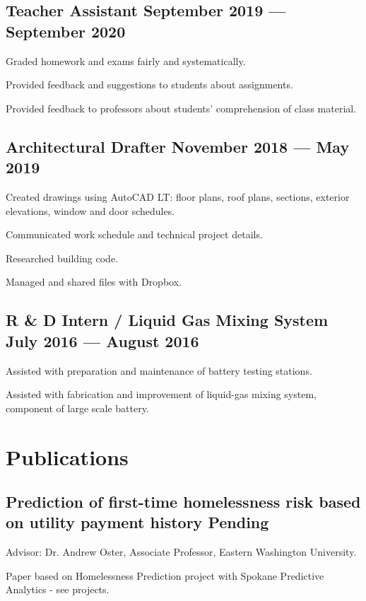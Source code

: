 \documentclass[letter,10pt]{article}
\begin{document}
\subsection{{Teacher Assistant \hfill September 2019 --- September 2020}}
\begin{zitemize}
    \item Graded homework and exams fairly and systematically.
    \item Provided feedback and suggestions to students about assignments.
    \item Provided feedback to professors about students' comprehension of class material.
\end{zitemize}

\subsection{{Architectural Drafter \hfill November 2018 --- May 2019}}
\begin{zitemize}
    \item Created drawings using AutoCAD LT: floor plans, roof plans, sections, exterior elevations, window and door schedules.
    \item Communicated work schedule and technical project details.
    \item Researched building code.
    \item Managed and shared files with Dropbox.
\end{zitemize}

\subsection{{R \& D Intern / Liquid Gas Mixing System \hfill July 2016 --- August 2016}}
\begin{zitemize}
    \item Assisted with preparation and maintenance of battery testing stations.
    \item Assisted with fabrication and improvement of liquid-gas mixing system, component of large scale battery.
\end{zitemize}


\section{Publications}
\subsection{Prediction of first-time homelessness risk based on utility
payment history \hfill Pending}
\begin{zitemize}
    \item Advisor: Dr. Andrew Oster, Associate Professor, Eastern Washington University.
    \item Paper based on Homelessness Prediction project with Spokane Predictive Analytics - see projects.
\end{zitemize}
\end{document}
